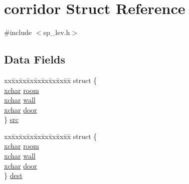 \hypertarget{structcorridor}{\section{corridor Struct Reference}
\label{structcorridor}
}


{\ttfamily \#include $<$sp\+\_\+lev.\+h$>$}

\subsection*{Data Fields}
\begin{DoxyCompactItemize}
\item 
\begin{tabbing}
xx\=xx\=xx\=xx\=xx\=xx\=xx\=xx\=xx\=\kill
struct \{\\
\>\hyperlink{global_8h_a2043b7d01ce89f4ee2fa6c345a752d32}{xchar} \hyperlink{structcorridor_af00114170dcd0889820aa58e1e7288a0}{room}\\
\>\hyperlink{global_8h_a2043b7d01ce89f4ee2fa6c345a752d32}{xchar} \hyperlink{structcorridor_a07d9e210f604e30abf5c36c7d7db1b71}{wall}\\
\>\hyperlink{global_8h_a2043b7d01ce89f4ee2fa6c345a752d32}{xchar} \hyperlink{structcorridor_a1940d9ead4d121f63d1d2f817c975680}{door}\\
\} \hyperlink{structcorridor_acbdc58c6cb46b4ec6d65bd41c75e7f3f}{src}\\

\end{tabbing}\item 
\begin{tabbing}
xx\=xx\=xx\=xx\=xx\=xx\=xx\=xx\=xx\=\kill
struct \{\\
\>\hyperlink{global_8h_a2043b7d01ce89f4ee2fa6c345a752d32}{xchar} \hyperlink{structcorridor_af00114170dcd0889820aa58e1e7288a0}{room}\\
\>\hyperlink{global_8h_a2043b7d01ce89f4ee2fa6c345a752d32}{xchar} \hyperlink{structcorridor_a07d9e210f604e30abf5c36c7d7db1b71}{wall}\\
\>\hyperlink{global_8h_a2043b7d01ce89f4ee2fa6c345a752d32}{xchar} \hyperlink{structcorridor_a1940d9ead4d121f63d1d2f817c975680}{door}\\
\} \hyperlink{structcorridor_a5ffa6faa08a26c327a29f0ac3eaad1e1}{dest}\\

\end{tabbing}\end{DoxyCompactItemize}


